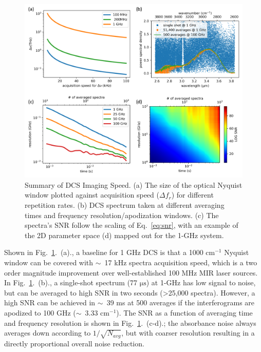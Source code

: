 \documentclass{optica-article}
\begin{document}
\begin{figure}[h]
    \centering
    \includegraphics[width=\linewidth]{snr_analysis.png}
    \caption{Summary of DCS Imaging Speed. (a) The size of the optical Nyquist window plotted against acquisition speed ($\Delta f_r$) for different repetition rates. (b) DCS spectrum taken at different averaging times and frequency resolution/apodization windows. (c) The spectra's SNR follow the scaling of Eq.~\ref{eq:snr}, with an example of the 2D parameter space (d) mapped out for the 1-GHz system.}
    \label{fig:snr_analysis}
\end{figure}

Shown in Fig.~\ref{fig:snr_analysis}.~(a)., a baseline for 1 GHz DCS is that a 1000 $\mathrm{cm^{-1}}$ Nyquist window can be covered with $\sim$~17 kHz spectra acquisition speed, which is a two order magnitude improvement over well-established 100 MHz MIR laser sources. In Fig.~\ref{fig:snr_analysis}.~(b)., a single-shot spectrum (77 $\mathrm{\mu s}$) at 1-GHz has low signal to noise, but can be averaged to high SNR in two seconds (>25,000 spectra). However, a high SNR can be achieved in $\sim$~39 ms at 500 averages if the interferograms are apodized to 100 GHz ($\sim$~3.33 $\mathrm{cm^{-1}}$).  The SNR as a function of averaging time and frequency resolution is shown in Fig.~\ref{fig:snr_analysis}.~(c-d).; the absorbance noise always averages down according to $1/\sqrt{N_{avg}}$, but with coarser resolution resulting in a directly proportional overall noise reduction. 



\end{document}
